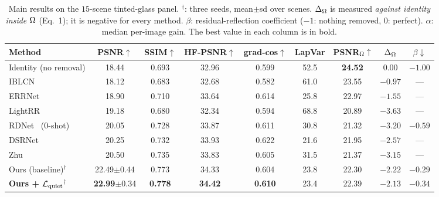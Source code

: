 \begin{table}[t]
\centering
\caption{Main results on the $15$-scene tinted-glass panel. $^\dagger$: three seeds,
mean$\pm$sd over scenes. $\Delta_\Omega$ is measured \emph{against identity inside $\Omega$}
(Eq.~1); it is negative for every method. $\beta$: residual-reflection coefficient
($-1$: nothing removed, $0$: perfect). $\alpha$: median per-image gain. The best value in each
column is in bold.}
\label{tab:main}
\setlength{\tabcolsep}{4pt}
\small
\begin{tabular}{lcccccccc}
\toprule
Method & PSNR$\uparrow$ & SSIM$\uparrow$ & HF-PSNR$\uparrow$ & grad-cos$\uparrow$ & LapVar & PSNR$_\Omega\uparrow$ & $\Delta_\Omega$ & $\beta$$\downarrow$ \\
\midrule
Identity (no removal)      & 18.44 & 0.693 & 32.96 & 0.599 & 52.5 & \textbf{24.52} & $0.00$ & $-1.00$ \\
IBLCN~\cite{li20}          & 18.12 & 0.683 & 32.68 & 0.582 & 61.0 & 23.55 & $-0.97$ & --- \\
ERRNet~\cite{wei19}        & 18.90 & 0.710 & 33.64 & 0.614 & 25.8 & 22.97 & $-1.55$ & --- \\
LightRR~\cite{lightrr26}   & 19.18 & 0.680 & 32.34 & 0.594 & 68.8 & 20.89 & $-3.63$ & --- \\
RDNet~\cite{rdnet25} (0-shot) & 20.05 & 0.728 & 33.87 & 0.611 & 30.8 & 21.32 & $-3.20$ & $-0.59$ \\
DSRNet~\cite{dsrnet24}     & 20.25 & 0.732 & 33.93 & 0.622 & 21.6 & 21.95 & $-2.57$ & --- \\
Zhu~\cite{zhu24}           & 20.50 & 0.735 & 33.83 & 0.605 & 31.5 & 21.37 & $-3.15$ & --- \\
\midrule
Ours (baseline)$^\dagger$  & 22.49$\pm$0.44 & 0.773 & 34.33 & 0.604 & 23.8 & 22.30 & $-2.22$ & $-0.29$ \\
\textbf{Ours + $\mathcal{L}_{\mathrm{quiet}}$}$^\dagger$ & \textbf{22.99}$\pm$0.34 & \textbf{0.778} & \textbf{34.42} & \textbf{0.610} & 23.4 & 22.39 & $-2.13$ & $-0.34$ \\
\bottomrule
\end{tabular}
\end{table}
